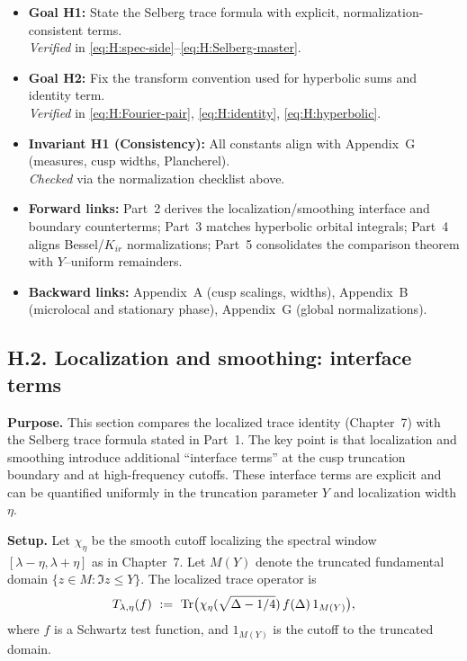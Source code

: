 \bigskip
\begin{auditblock}[H.1 — Audit]
\begin{itemize}
  \item \textbf{Goal H1:} State the Selberg trace formula with explicit, normalization-consistent terms.\\
        \emph{Verified} in \eqref{eq:H:spec-side}–\eqref{eq:H:Selberg-master}.
  \item \textbf{Goal H2:} Fix the transform convention used for hyperbolic sums and identity term.\\
        \emph{Verified} in \eqref{eq:H:Fourier-pair}, \eqref{eq:H:identity}, \eqref{eq:H:hyperbolic}.
  \item \textbf{Invariant H1 (Consistency):} All constants align with Appendix~G (measures, cusp widths, Plancherel).\\
        \emph{Checked} via the normalization checklist above.
  \item \textbf{Forward links:} Part~2 derives the localization/smoothing interface and boundary counterterms;
        Part~3 matches hyperbolic orbital integrals; Part~4 aligns Bessel/$K_{ir}$ normalizations; Part~5 consolidates
        the comparison theorem with $Y$–uniform remainders.
  \item \textbf{Backward links:} Appendix~A (cusp scalings, widths), Appendix~B (microlocal and stationary phase),
        Appendix~G (global normalizations).
\end{itemize}
\end{auditblock}

\subsection*{H.2. Localization and smoothing: interface terms}
\label{appH:localization}

\noindent\textbf{Purpose.}
This section compares the localized trace identity (Chapter~7) with the Selberg trace formula 
stated in Part~1. The key point is that localization and smoothing introduce additional 
“interface terms” at the cusp truncation boundary and at high-frequency cutoffs. 
These interface terms are explicit and can be quantified uniformly in the truncation 
parameter $Y$ and localization width $\eta$.

\medskip
\noindent\textbf{Setup.}
Let $\chi_\eta$ be the smooth cutoff localizing the spectral window 
$[\lambda-\eta,\lambda+\eta]$ as in Chapter~7. Let $M(Y)$ denote the truncated fundamental 
domain $\{z\in M: \Im z\le Y\}$. The localized trace operator is
\[
T_{\lambda,\eta}(f)\ :=\ \Tr\!\big(\chi_\eta(\sqrt{\Delta-1/4})\,f(\Delta)\,1_{M(Y)}\big),
\]
where $f$ is a Schwartz test function, and $1_{M(Y)}$ is the cutoff to the truncated domain.

